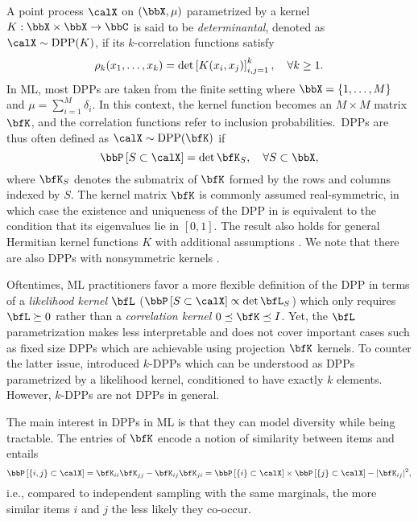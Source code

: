 \documentclass[twoside,11pt]{article}
\begin{document}
        A point process $\calX$ on $(\bbX,\mu)$ parametrized by a kernel $K:\bbX\times \bbX\rightarrow \bbC$ is said to be \emph{determinantal}, denoted as $\calX\sim\DPP(K)$, if its $k$-correlation functions satisfy
        \begin{equation*}
            \label{eq:k-correlation_function_DPP}
            \rho_k(x_1,\dots,x_k)
              = \det \left[ K(x_i, x_j) \right]_{i,j=1}^k,
            \quad \forall k\geq 1.
        \end{equation*}
        In ML, most DPPs are taken from the finite setting where $\bbX = \lrcb{1,\dots,M}$ and $\mu=\sum_{i=1}^M \delta_i$.
        In this context, the kernel function becomes an $M\times M$ matrix $\bfK$, and the correlation functions refer to inclusion probabilities.~DPPs are thus often defined as $\calX\sim \DPP(\bfK)$ if
        \begin{equation}
        \label{eq:inclusion_proba_finite}
            \Proba{S \subset \calX} = \det \bfK_S,
                \quad\forall S\subset \bbX,
        \end{equation}
        where ${\bfK}_S$ denotes the submatrix of $\bfK$ formed by the rows and columns indexed by $S$.
        The kernel matrix $\bfK$ is commonly assumed real-symmetric, in which case the existence and uniqueness of the DPP in  is equivalent to the condition that its eigenvalues lie in $[0,1]$.
        The result also holds for general Hermitian kernel functions $K$ with additional assumptions \cite[Theorem 3]{Sos00}.
        We note that there are also DPPs with nonsymmetric kernels \citep{BoDiFu10}.

        Oftentimes, ML practitioners favor a more flexible definition of the DPP in terms of a \emph{likelihood kernel} $\bfL$
        ($\Proba{S \subset \calX}\propto \det \bfL_S$) which only requires $\bfL\succeq 0$
        rather than a \emph{correlation kernel} $0\preceq \bfK \preceq I$.
        Yet, the $\bfL$ parametrization makes  less interpretable and does not cover important cases such as fixed size DPPs which are achievable using projection $\bfK$ kernels.
        To counter the latter issue, \citet[Section 5]{KuTa12} introduced $k$-DPPs which can be understood as DPPs parametrized by a likelihood kernel, conditioned to have exactly $k$ elements.
        However, $k$-DPPs are not DPPs in general.

        The main interest in DPPs in ML is that they can model diversity while being tractable.
        The entries of $\bfK$ encode a notion of similarity between items and  entails
        \begin{equation*}
        \label{eq:2point_correlation_function_inclusion_proba_finite_case}
          \Proba{\{i,j\} \subset \calX}
            = {\bfK}_{ii}{\bfK}_{jj}-{\bfK}_{ij}{\bfK}_{ji}
            = \Proba{\{i\} \subset \calX}
              \times \Proba{\{j\} \subset \calX}
                - |{\bfK}_{ij}|^2,
        \end{equation*}
        i.e., compared to independent sampling with the same marginals, the more similar items $i$ and $j$ the less likely they co-occur.
\end{document}

